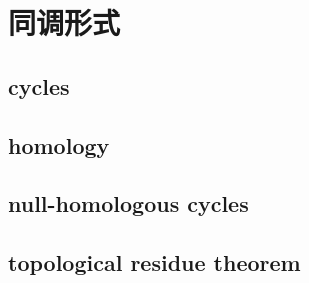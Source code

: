 \section{同调形式}
\label{b3:sec:1003}


\subsection{cycles}
\label{b3:subsec:100301}

\subsection{homology}
\label{b3:subsec:100302}

\subsection{null-homologous cycles}
\label{b3:subsec:100303}

\subsection{topological residue theorem}
\label{b3:subsec:100304}


